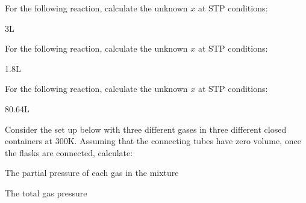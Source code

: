 \documentclass[main.tex]{subfiles}
\begin{document}
\begin{multicols*}{2}
\begin{question}[ID=\the\value{numA}]
For the following reaction, calculate the unknown $x$ at STP conditions:
\begin{center} \end{center}
\end{question}
\begin{solution}
3L
\hspace{0.1cm}\end{solution}%
\begin{question}[ID=\the\value{numA}]
For the following reaction, calculate the unknown $x$ at STP conditions:
\begin{center} \end{center}
\end{question}
\begin{solution}
1.8L
\hspace{0.1cm}\end{solution}%
\begin{question}[ID=\the\value{numA}]
For the following reaction, calculate the unknown $x$ at STP conditions:
\begin{center} \end{center}
\end{question}
\begin{solution}
80.64L
\hspace{0.1cm}\end{solution}%




\begin{question}[ID=\the\value{numA}]
Consider the set up below with three different gases in three different closed containers at 300K. Assuming that the connecting tubes have zero volume, once the flasks are connected, calculate:
\begin{inparaenum}[(a)]	
\item  The partial pressure of each gas in the mixture
\item  The total gas pressure
\end{inparaenum} 


\end{question}
\end{multicols*}
\end{document}
